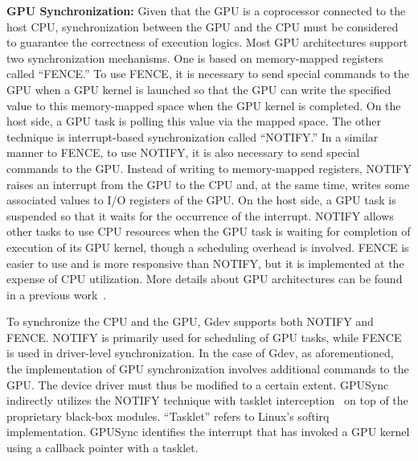 \textbf{GPU Synchronization:}
 Given that the GPU is a coprocessor connected to the host CPU, synchronization between the GPU and the CPU must be considered to guarantee the correctness of execution logics.
Most GPU architectures support two synchronization mechanisms.
One is based on memory-mapped registers called ``FENCE.''
To use FENCE, it is necessary to send special commands to the GPU when a GPU kernel is launched so that the GPU can write the specified value to this memory-mapped space when the GPU kernel is completed.
On the host side, a GPU task is polling this value via the mapped space.
The other technique is interrupt-based synchronization called ``NOTIFY.''
In a similar manner to FENCE, to use NOTIFY, it is also necessary to send special commands to the GPU.
Instead of writing to memory-mapped registers, NOTIFY raises an interrupt from the GPU to the CPU and, at the same time, writes some associated values to I/O registers of the GPU.
On the host side, a GPU task is suspended so that it waits for the occurrence of the interrupt.
NOTIFY allows other tasks to use CPU resources when the GPU task is waiting for completion of execution of its GPU kernel, though a scheduling overhead is involved.
FENCE is easier to use and is more responsive than NOTIFY, but it is implemented at the expense of CPU utilization.
More details about GPU architectures can be found in a previous work~\cite{kato:timegraph, kato:gdev, fujii:apsys2013}.

To synchronize the CPU and the GPU, Gdev supports both NOTIFY and FENCE.
NOTIFY is primarily used for scheduling of GPU tasks, while FENCE is used in driver-level synchronization.
In the case of Gdev, as aforementioned, the implementation of GPU synchronization involves additional commands to the GPU.
The device driver must thus be modified to a certain extent.
GPUSync indirectly utilizes the NOTIFY technique with tasklet interception~\cite{elliott2012robust} on top of the proprietary black-box modules.
``Tasklet'' refers to Linux's softirq implementation.
GPUSync identifies the interrupt that has invoked a GPU kernel using a callback pointer with a tasklet.

